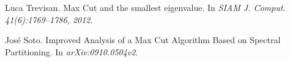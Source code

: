   
\begin{thebibliography}{1}
Luca Trevisan.
\newblock Max Cut and the smallest eigenvalue.
\newblock In {\em SIAM J. Comput. 41(6):1769–1786, 2012}.


José Soto.
\newblock Improved Analysis of a Max Cut Algorithm Based on Spectral Partitioning.
\newblock In {\em arXiv:0910.0504v2}.

\end{thebibliography}